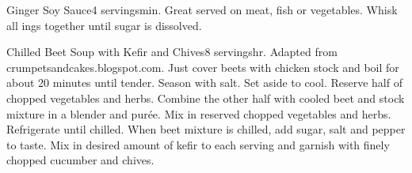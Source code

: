 \newpage 
\begin{recipe}{Ginger Soy Sauce}{4 servings}{\unit[5]{min.}}
\freeform Great served on meat, fish or vegetables.
\freeform Whisk all ings together until sugar is dissolved.
\end{recipe}
\newpage
\begin{recipe}{Chilled Beet Soup with Kefir and Chives}{8 servings}{\unit[1]{hr.}}
\freeform Adapted from crumpetsandcakes.blogspot.com.
Just cover beets with chicken stock and boil for about 20 minutes until tender. Season with salt. Set aside to cool.
Reserve half of chopped vegetables and herbs. Combine the other half with cooled beet and stock mixture in a blender and pur\'{e}e. Mix in reserved chopped vegetables and herbs. Refrigerate until chilled.
When beet mixture is chilled, add sugar, salt and pepper to taste. Mix in desired amount of kefir to each serving and garnish with finely chopped cucumber and chives.
\end{recipe}
